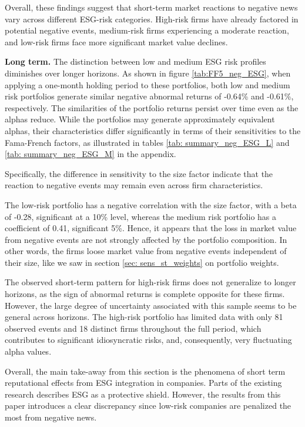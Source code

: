 Overall, these findings suggest that short-term market reactions to negative news vary across different ESG-risk categories. High-risk firms have already factored in potential negative events, medium-risk firms experiencing a moderate reaction, and low-risk firms face more significant market value declines.

\textbf{Long term.} The distinction between low and medium ESG risk profiles diminishes over longer horizons. As shown in figure \ref{tab:FF5_neg_ESG}, when applying a one-month holding period to these portfolios, both low and medium risk portfolios generate similar negative abnormal returns of -0.64\% and -0.61\%, respectively. The similarities of the portfolio returns persist over time even as the alphas reduce. While the portfolios may generate approximately equivalent alphas, their characteristics differ significantly in terms of their sensitivities to the Fama-French factors, as illustrated in tables \ref{tab: summary_neg_ESG_L} and \ref{tab: summary_neg_ESG_M} in the appendix. 

Specifically, the difference in sensitivity to the size factor indicate that the reaction to negative events may remain even across firm characteristics. 

The low-risk portfolio has a negative correlation with the size factor, with a beta of -0.28, significant at a 10\% level, whereas the medium risk portfolio has a coefficient of 0.41, significant 5\%. Hence, it appears that the loss in market value from negative events are not strongly affected by the portfolio composition. In other words, the firms loose market value from negative events independent of their size, like we saw in section \ref{sec: sens_st_weights} on portfolio weights.  

The observed short-term pattern for high-risk firms does not generalize to longer horizons, as the sign of abnormal returns is complete opposite for these firms. However, the large degree of uncertainty associated with this sample seems to be general across horizons. The high-risk portfolio has limited data with only 81 observed events and 18 distinct firms throughout the full period, which contributes to significant idiosyncratic risks, and, consequently, very fluctuating alpha values. 

Overall, the main take-away from this section is the phenomena of short term reputational effects from ESG integration in companies. Parts of the existing research describes ESG as a protective shield. However, the results from this paper introduces a clear discrepancy since low-risk companies are penalized the most from negative news.  


